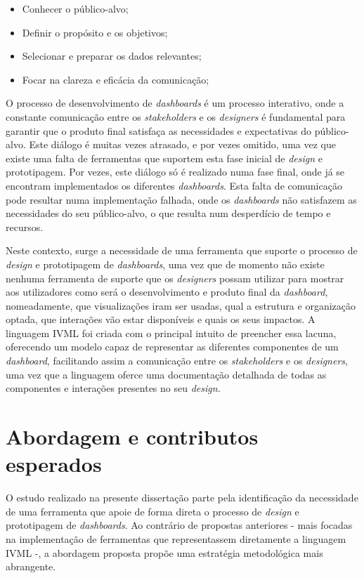 \begin{itemize}
    \item Conhecer o público-alvo;
    \item Definir o propósito e os objetivos;
    \item Selecionar e preparar os dados relevantes;
    \item Focar na clareza e eficácia da comunicação;
\end{itemize}

O processo de desenvolvimento de \textit{dashboards} é um processo interativo, onde a constante comunicação entre os \textit{stakeholders} e os \textit{designers} é fundamental para garantir que o produto final satisfaça as necessidades e expectativas do público-alvo. Este diálogo é muitas vezes atrasado, e por vezes omitido, uma vez que existe uma falta de ferramentas que suportem esta fase inicial de \textit{design} e prototipagem. Por vezes, este diálogo só é realizado numa fase final, onde já se encontram implementados os diferentes \textit{dashboards}. Esta falta de comunicação pode resultar numa implementação falhada, onde os \textit{dashboards} não satisfazem as necessidades do seu público-alvo, o que resulta num desperdício de tempo e recursos.

Neste contexto, surge a necessidade de uma ferramenta que suporte o processo de \textit{design} e prototipagem de \textit{dashboards}, uma vez que de momento não existe nenhuma ferramenta de suporte que os \textit{designers} possam utilizar para mostrar aos utilizadores como será o desenvolvimento e produto final da \textit{dashboard}, nomeadamente, que visualizações iram ser usadas, qual a estrutura e organização optada, que interações vão estar disponíveis e quais os seus impactos. A linguagem \gls{IVML} foi criada com o principal intuito de preencher essa lacuna, oferecendo um modelo capaz de representar as diferentes componentes de um \textit{dashboard}, facilitando assim a comunicação entre os \textit{stakeholders} e os \textit{designers}, uma vez que a linguagem oferce uma documentação detalhada de todas as componentes e interações presentes no seu \textit{design}.

\section{Abordagem e contributos esperados}
\label{sec:contribuicoes}

O estudo realizado na presente dissertação parte pela identificação da necessidade de uma ferramenta que apoie de forma direta o processo de \textit{design} e prototipagem de \textit{dashboards}. Ao contrário de propostas anteriores - mais focadas na implementação de ferramentas que representassem diretamente a linguagem \gls{IVML} -, a abordagem proposta propõe uma estratégia metodológica mais abrangente.

